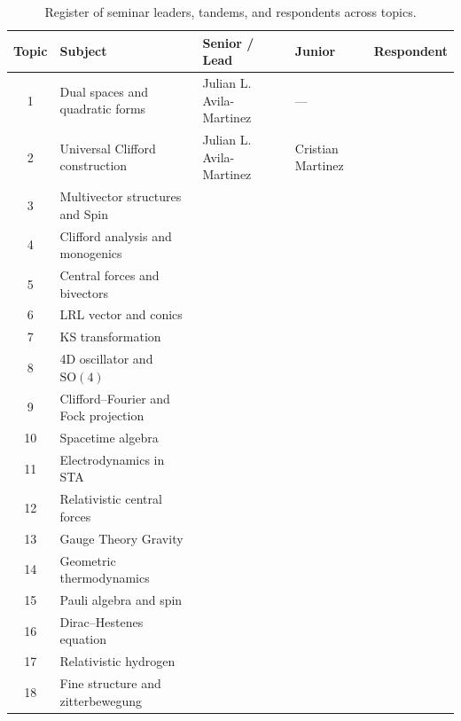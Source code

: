 \documentclass[11pt,a4paper]{article}
\begin{document}
\begin{table}[ht]
\centering
\caption{Register of seminar leaders, tandems, and respondents across topics.}
\label{tab:tandems}
\renewcommand{\arraystretch}{1.15}
\begin{tabular}{@{}cp{4.1cm}p{3.8cm}p{3.1cm}p{2.4cm}@{}}
\toprule
Topic & Subject & Senior / Lead & Junior & Respondent \\
\midrule
1  & Dual spaces and quadratic forms   & Julian L. Avila-Martinez & --- & \\[2pt]
2  & Universal Clifford construction  & Julian L. Avila-Martinez &
     Cristian Martinez & \\[2pt]
3  & Multivector structures and Spin  & & & \\[2pt]
4  & Clifford analysis and monogenics & & & \\[2pt]
5  & Central forces and bivectors     & & & \\[2pt]
6  & LRL vector and conics            & & & \\[2pt]
7  & KS transformation                & & & \\[2pt]
8  & 4D oscillator and $\mathrm{SO}(4)$ & & & \\[2pt]
9  & Clifford--Fourier and Fock projection & & & \\[2pt]
10 & Spacetime algebra                & & & \\[2pt]
11 & Electrodynamics in STA           & & & \\[2pt]
12 & Relativistic central forces      & & & \\[2pt]
13 & Gauge Theory Gravity             & & & \\[2pt]
14 & Geometric thermodynamics         & & & \\[2pt]
15 & Pauli algebra and spin           & & & \\[2pt]
16 & Dirac--Hestenes equation         & & & \\[2pt]
17 & Relativistic hydrogen            & & & \\[2pt]
18 & Fine structure and zitterbewegung & & & \\
\bottomrule
\end{tabular}
\end{table}

\printbibliography
\end{document}
